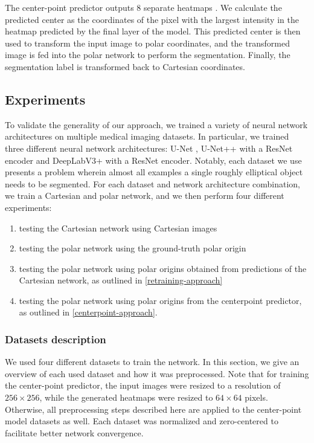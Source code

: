 The center-point predictor outputs 8 separate heatmaps \cite{newellStackedHourglassNetworks2016}. We
calculate the predicted center as the coordinates of the pixel with the largest intensity in the heatmap
predicted by the final layer of the model. This predicted center is then used to transform the input
image to polar coordinates, and the transformed image is fed into the polar network to perform
the segmentation. Finally, the segmentation label is transformed back to Cartesian coordinates.
    
  \subsection{Experiments} \label{experiments}
  
To validate the generality of our approach, we trained a variety of neural network architectures on 
multiple medical imaging datasets. In particular, we trained three different neural network 
architectures: U-Net \cite{ronnebergerUNetConvolutionalNetworks2015}, U-Net++ 
\cite{zhouUNetNestedUNet2018a} with a ResNet encoder and DeepLabV3+ 
\cite{chenEncoderDecoderAtrousSeparable2018a} with a ResNet encoder. Notably, each dataset we use presents a problem wherein almost all examples a single roughly elliptical object needs to be segmented. 
For each dataset and network architecture combination, we train a Cartesian and polar network, and we then 
perform four different experiments: 

\begin{enumerate}
	\item{testing the Cartesian network using Cartesian images}
	\item{testing the polar network using the ground-truth polar origin}
	\item{testing the polar network using polar origins obtained from predictions of the Cartesian network, as outlined in \ref{retraining-approach}}
	\item{testing the polar network using polar origins from the centerpoint predictor, as outlined in \ref{centerpoint-approach}}.
\end{enumerate}

    \subsubsection{Datasets description}

We used four different datasets to train the network. In this section, we give an overview of each used dataset and how it was preprocessed. Note that for training the center-point predictor, the input images were resized to a resolution of $256 \times 256$, while the generated heatmaps were resized to $64 \times 64$ pixels. Otherwise, all preprocessing steps described here are applied to the center-point model datasets as well. Each dataset was normalized and zero-centered to facilitate better network convergence. 

